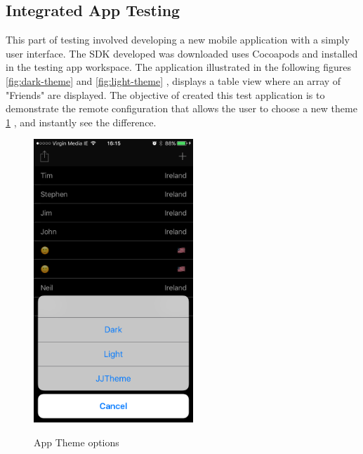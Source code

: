 \subsection{Integrated App Testing}

This part of testing involved developing a new mobile application with a simply user interface. The SDK developed was downloaded uses Cocoapods and installed in the testing app workspace. The application illustrated in the following figures \ref{fig:dark-theme} and \ref{fig:light-theme} , displays a table view where an array of "Friends" are displayed. The objective of created this test application is to demonstrate the remote configuration that allows the user to choose a new theme \ref{fig:app-themes-options} , and instantly see the difference. 

\begin{figure}[!h]
    \caption{App Theme options}
    \centering
    \includegraphics[width=60mm]{images/testing/themes}
    \label{fig:app-themes-options}
\end{figure} 

